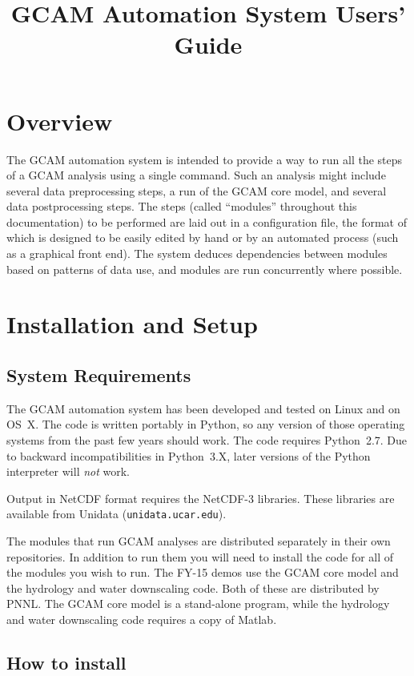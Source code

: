 \documentclass[11pt]{article}
\title{{GCAM} Automation System Users' Guide}
\begin{document}
\maketitle

\section{Overview}
The GCAM automation system is intended to provide a way to run all the
steps of a GCAM analysis using a single command.  Such an analysis
might include several data preprocessing steps, a run of the GCAM core
model, and several data postprocessing steps.  The steps (called
``modules'' throughout this documentation) to be performed are laid
out in a configuration file, the format of which is designed to be
easily edited by hand or by an automated process (such as a graphical
front end).  The system deduces dependencies between modules based on
patterns of data use, and modules are run concurrently where possible.


\section{Installation and Setup}
\subsection{System Requirements}

The GCAM automation system has been developed and tested on Linux and
on OS~X.  The code is written portably in Python, so any version of
those operating systems from the past few years should work.  The code
requires Python~2.7.  Due to backward incompatibilities in Python~3.X,
later versions of the Python interpreter will \emph{not} work.

Output in NetCDF format requires the NetCDF-3 libraries.  These
libraries are available from Unidata (\texttt{unidata.ucar.edu}).

The modules that run GCAM analyses are distributed separately in their
own repositories.  In addition to run them you will need to install
the code for all of the modules you wish to run.  The FY-15 demos use
the GCAM core model and the hydrology and water downscaling code.
Both of these are distributed by PNNL.  The GCAM core model is a
stand-alone program, while the hydrology and water downscaling code
requires a copy of Matlab.

\subsection{How to install}
\end{document}
